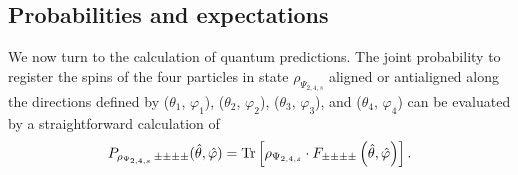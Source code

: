 \documentclass[rmp,amsfonts,showpacs,showkeys,preprint]{revtex4}
\begin{document}
\subsection{Probabilities and expectations}

We now turn to the calculation of quantum predictions.
The joint probability to register the spins of the four particles
in state $\rho_{\Psi_{2,4,s}}$
aligned or antialigned along the directions defined by
($\theta_1$, $\varphi_1 $),
($\theta_2$, $\varphi_2 $),
($\theta_3$, $\varphi_3 $),  and
($\theta_4$, $\varphi_4 $) can be evaluated by a straightforward calculation
of
\begin{equation}
P_{\rho_{\Psi_{2,4,s}}\,\pm \pm \pm \pm} ({\hat \theta},{\hat \varphi} )=
{\rm Tr}\left[\rho_{\Psi_{2,4,s}} \cdot F_{\pm \pm \pm \pm} \left({\hat \theta},{\hat \varphi} \right)\right].
\end{equation}
\end{document}

